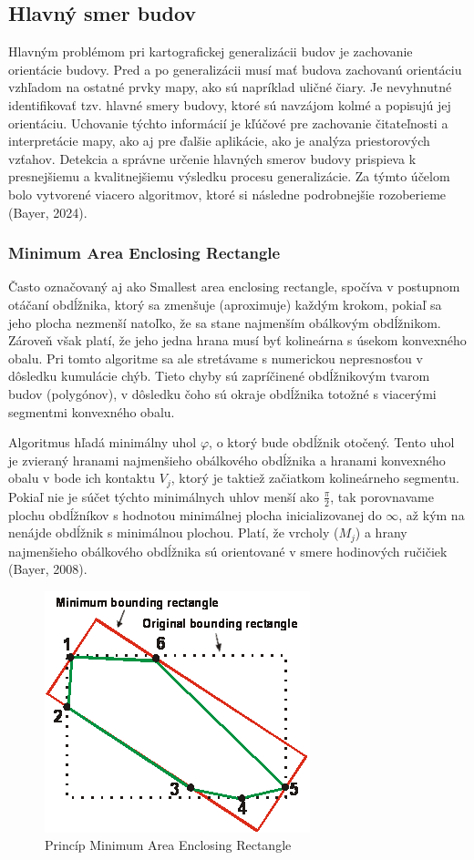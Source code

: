 \documentclass[12pt]{article}
\begin{document}
\subsection*{Hlavný smer budov}
Hlavným problémom pri kartografickej generalizácii budov je zachovanie orientácie budovy. Pred a po generalizácii musí mať budova zachovanú orientáciu vzhľadom na ostatné prvky mapy, ako sú napríklad uličné čiary. Je nevyhnutné identifikovať tzv. hlavné smery budovy, ktoré sú navzájom kolmé a popisujú jej orientáciu. Uchovanie týchto informácií je kľúčové pre zachovanie čitateľnosti a interpretácie mapy, ako aj pre ďalšie aplikácie, ako je  analýza priestorových vzťahov. Detekcia a správne určenie hlavných smerov budovy prispieva k presnejšiemu a kvalitnejšiemu výsledku procesu generalizácie. Za týmto účelom bolo vytvorené viacero algoritmov, ktoré si následne podrobnejšie rozoberieme (Bayer, 2024).


\subsubsection*{Minimum Area Enclosing Rectangle}
Často označovaný aj ako Smallest area enclosing rectangle, spočíva v postupnom otáčaní obdĺžnika, ktorý sa zmenšuje (aproximuje) každým krokom, pokiaľ sa jeho plocha nezmenší natoľko, že sa stane najmenším obálkovým obdĺžnikom. Zároveň však platí, že jeho jedna hrana musí byť kolineárna s úsekom konvexného obalu. Pri tomto algoritme sa ale stretávame s numerickou nepresnosťou v dôsledku kumulácie chýb. Tieto chyby sú zapríčinené obdĺžnikovým tvarom budov (polygónov), v dôsledku čoho sú okraje obdĺžnika totožné s viacerými segmentmi konvexného obalu.\par
Algoritmus hľadá minimálny uhol $\varphi$, o ktorý bude obdĺžnik otočený. Tento uhol je zvieraný hranami najmenšieho obálkového obdĺžnika a hranami konvexného obalu v bode ich kontaktu $V_j$, ktorý je taktiež začiatkom kolineárneho segmentu. Pokiaľ nie je súčet týchto minimálnych uhlov menší ako $\frac{\pi}{2}$, tak porovnavame plochu obdĺžníkov s hodnotou minimálnej plocha inicializovanej do $\infty$, až kým na nenájde obdĺžnik s minimálnou plochou. Platí, že vrcholy ($M_j$) a hrany najmenšieho obálkového obdĺžnika sú orientované v smere hodinových ručičiek (Bayer, 2008).

\begin{figure} [h]
    \centering
    \includegraphics[width=0.62\linewidth]{latex/image/maer.png}
    \caption{Princíp Minimum Area Enclosing Rectangle}
    \label{fig:enter-label}
\end{figure}
\end{document}
